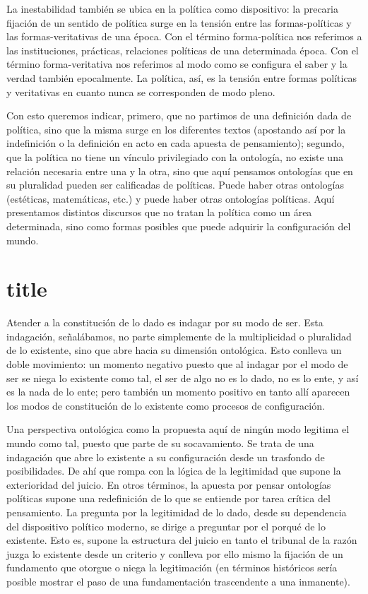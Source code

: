La inestabilidad también se ubica en la política como dispositivo: la precaria fijación de un sentido de política surge en la tensión entre las formas-políticas y las formas-veritativas de una época. Con el término forma-política nos referimos a las instituciones, prácticas, relaciones políticas de una determinada época. Con el término forma-veritativa nos referimos al modo como se configura el saber y la verdad también epocalmente. La política, así, es la tensión entre formas políticas y veritativas en cuanto nunca se corresponden de modo pleno.

Con esto queremos indicar, primero, que no partimos de una definición dada de política, sino que la misma surge en los diferentes textos (apostando así por la indefinición o la definición en acto en cada apuesta de pensamiento); segundo, que la política no tiene un vínculo privilegiado con la ontología, no existe una relación necesaria entre una y la otra, sino que aquí pensamos ontologías que en su pluralidad pueden ser calificadas de políticas. Puede haber otras ontologías (estéticas, matemáticas, etc.) y puede haber otras ontologías políticas. Aquí presentamos distintos discursos que no tratan la política como un área determinada, sino como formas posibles que puede adquirir la configuración del mundo.

\section{title}

Atender a la constitución de lo dado es indagar por su modo de ser. Esta indagación, señalábamos, no parte simplemente de la multiplicidad o pluralidad de lo existente, sino que abre hacia su dimensión ontológica. Esto conlleva un doble movimiento: un momento negativo puesto que al indagar por el modo de ser se niega lo existente como tal, el ser de algo no es lo dado, no es lo ente, y así es la nada de lo ente; pero también un momento positivo en tanto allí aparecen los modos de constitución de lo existente como procesos de configuración.

Una perspectiva ontológica como la propuesta aquí de ningún modo legitima el mundo como tal, puesto que parte de su socavamiento. Se trata de una indagación que abre lo existente a su configuración desde un trasfondo de posibilidades. De ahí que rompa con la lógica de la legitimidad que supone la exterioridad del juicio. En otros términos, la apuesta por pensar ontologías políticas supone una redefinición de lo que se entiende por tarea crítica del pensamiento. La pregunta por la legitimidad de lo dado, desde su dependencia del dispositivo político moderno, se dirige a preguntar por el porqué de lo existente. Esto es, supone la estructura del juicio en tanto el tribunal de la razón juzga lo existente desde un criterio y conlleva por ello mismo la fijación de un fundamento que otorgue o niega la legitimación (en términos históricos sería posible mostrar el paso de una fundamentación trascendente a una inmanente).

